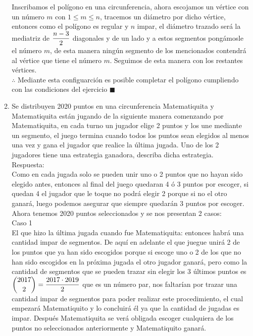\documentclass{book}
\begin{document}
\begin{enumerate}
        Inscribamos el polígono en una circunferencia, ahora escojamos un vértice con un número $m$ con $1\leq m\leq n$, tracemos un diámetro por dicho vértice, entonces como el polígono es regular y $n$ impar, el diámetro trazado será la mediatriz de $\displaystyle{{n-3 \over 2}}$ diagonales y de un lado y a estos segmentos pongámosle el número $m$, de esta manera ningún segmento de los mencionados contendrá al vértice que tiene el número $m$. Seguimos de esta manera con los restantes vértices.\\
        $\therefore$ Mediante esta configuarción es posible completar el polígono cumpliendo con las condiciones del ejercicio $\blacksquare$\\
        \item Se distribuyen 2020 puntos en una circunferencia Matematiquita y Matematiquita están jugando de la siguiente manera comenzando por Matematiquita, en cada turno un jugador elige 2 puntos y los une mediante un segmento, el juego termina cuando todos los puntos sean elegidos al menos una vez y gana el jugador que realice la última jugada. Uno de los 2 jugadores tiene una estrategia ganadora, describa dicha estrategia.\\
        Respuesta:\\
        Como en cada jugada solo se pueden unir uno o 2 puntos que no hayan sido elegido antes, entonces al final del juego quedaran 4 ó 3 puntos por escoger, si quedan 4 el jugador que le toque no podrá elegir 2 porque si no el otro ganará, luego podemos asegurar que siempre quedarán 3 puntos por escoger. Ahora tenemos 2020 puntos seleccionados y se nos presentan 2 casos:\\
        Caso 1\\
        El que hizo la última jugada cuando fue Matematiquita: entonces habrá una cantidad impar de segmentos. De aquí en adelante el que juegue unirá 2 de los puntos que ya han sido escogidos porque si escoge uno o 2 de los que no han sido escogidos en la próxima jugada el otro jugador ganará, pero como la cantidad de segmentos que se pueden trazar sin elegir los 3 últimos puntos es $\displaystyle{{2017 \choose 2}={2017\cdot 2019\over 2}}$ que es un número par, nos faltarían por trazar una cantidad impar de segmentos para poder realizar este procedimiento, el cual empezará Matematiquito y lo concluirá él ya que la cantidad de jugadas es impar. Después Matematiquita se verá obligada escoger cualquiera de los puntos no seleccionados anteriormente y Matematiquito ganará.\\

\end{enumerate}
\end{document}
